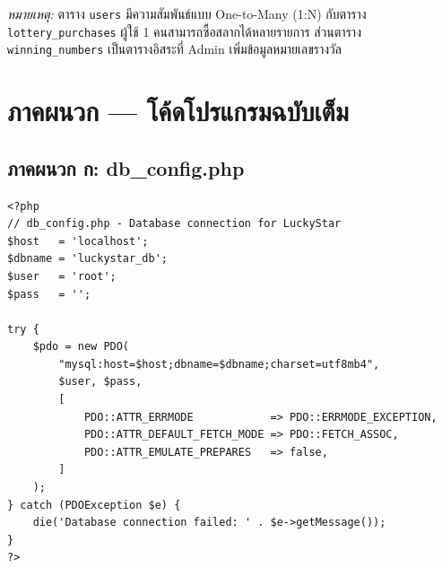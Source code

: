 \documentclass[a4paper,12pt]{article}
\begin{document}
\begin{center}
{}
\end{center}

\vspace{0.5em}
\noindent\textit{หมายเหตุ:} ตาราง \texttt{users} มีความสัมพันธ์แบบ One-to-Many (1:N) กับตาราง \texttt{lottery\_purchases} ผู้ใช้ 1 คนสามารถซื้อสลากได้หลายรายการ ส่วนตาราง \texttt{winning\_numbers} เป็นตารางอิสระที่ Admin เพิ่มข้อมูลหมายเลขรางวัล

\newpage

\section*{ภาคผนวก --- โค้ดโปรแกรมฉบับเต็ม}

\subsection*{ภาคผนวก ก: db\_config.php}

\begin{lstlisting}[style=phpstyle, caption={db\_config.php}]
<?php
// db_config.php - Database connection for LuckyStar
$host   = 'localhost';
$dbname = 'luckystar_db';
$user   = 'root';
$pass   = '';

try {
    $pdo = new PDO(
        "mysql:host=$host;dbname=$dbname;charset=utf8mb4",
        $user, $pass,
        [
            PDO::ATTR_ERRMODE            => PDO::ERRMODE_EXCEPTION,
            PDO::ATTR_DEFAULT_FETCH_MODE => PDO::FETCH_ASSOC,
            PDO::ATTR_EMULATE_PREPARES   => false,
        ]
    );
} catch (PDOException $e) {
    die('Database connection failed: ' . $e->getMessage());
}
?>
\end{lstlisting}
\end{document}
